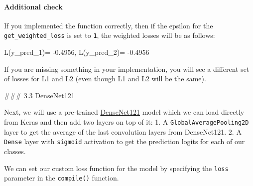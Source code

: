 \documentclass[11pt]{article}
\newenvironment{Shaded}{}{}
\newcommand{\FloatTok}[1]{\textcolor[rgb]{0.25,0.63,0.44}{{#1}}}
\newcommand{\NormalTok}[1]{{#1}}
\newcommand{\OperatorTok}[1]{\textcolor[rgb]{0.40,0.40,0.40}{{#1}}}
\begin{document}
    \hypertarget{additional-check}{%
\paragraph{Additional check}\label{additional-check}}

If you implemented the function correctly, then if the epsilon for the
\texttt{get\_weighted\_loss} is set to \texttt{1}, the weighted losses
will be as follows:

\begin{Shaded}
\begin{Highlighting}[]
\NormalTok{L(y_pred_1)}\OperatorTok{=} \FloatTok{-0.4956}\NormalTok{, L(y_pred_2)}\OperatorTok{=} \FloatTok{-0.4956}
\end{Highlighting}
\end{Shaded}

If you are missing something in your implementation, you will see a
different set of losses for L1 and L2 (even though L1 and L2 will be the
same).

     \#\#\# 3.3 DenseNet121

Next, we will use a pre-trained
\href{https://www.kaggle.com/pytorch/densenet121}{DenseNet121} model
which we can load directly from Keras and then add two layers on top of
it: 1. A \texttt{GlobalAveragePooling2D} layer to get the average of the
last convolution layers from DenseNet121. 2. A \texttt{Dense} layer with
\texttt{sigmoid} activation to get the prediction logits for each of our
classes.

We can set our custom loss function for the model by specifying the
\texttt{loss} parameter in the \texttt{compile()} function.
\end{document}
